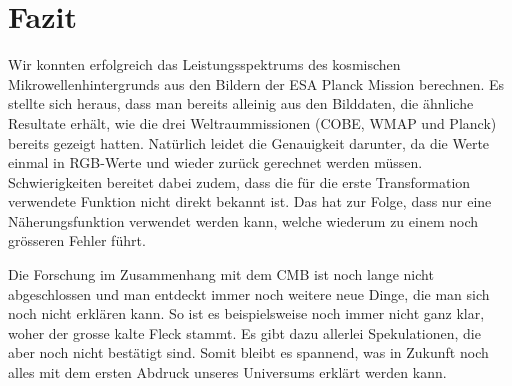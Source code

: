 \section{Fazit}

Wir konnten erfolgreich das Leistungsspektrums des kosmischen 
Mikrowellenhintergrunds aus den Bildern der ESA Planck Mission berechnen. Es 
stellte sich heraus, dass man bereits alleinig aus den Bilddaten, die ähnliche 
Resultate erhält, wie die drei Weltraummissionen (COBE, WMAP und Planck) 
bereits gezeigt hatten. Natürlich leidet die Genauigkeit darunter, da die Werte 
einmal in RGB-Werte und wieder zurück gerechnet werden müssen. Schwierigkeiten 
bereitet dabei zudem, dass die für die erste Transformation verwendete Funktion 
nicht direkt bekannt ist. Das hat zur Folge, dass nur eine Näherungsfunktion 
verwendet werden kann, welche wiederum zu einem noch grösseren Fehler führt.

Die Forschung im Zusammenhang mit dem CMB ist noch lange nicht abgeschlossen 
und man entdeckt immer noch weitere neue Dinge, die man sich noch nicht 
erklären kann. So ist es beispielsweise noch immer nicht ganz klar, woher der 
grosse kalte Fleck stammt. Es gibt dazu allerlei Spekulationen, die aber 
noch nicht bestätigt sind. Somit bleibt es spannend, was in Zukunft noch alles 
mit dem ersten Abdruck unseres Universums erklärt werden kann.
